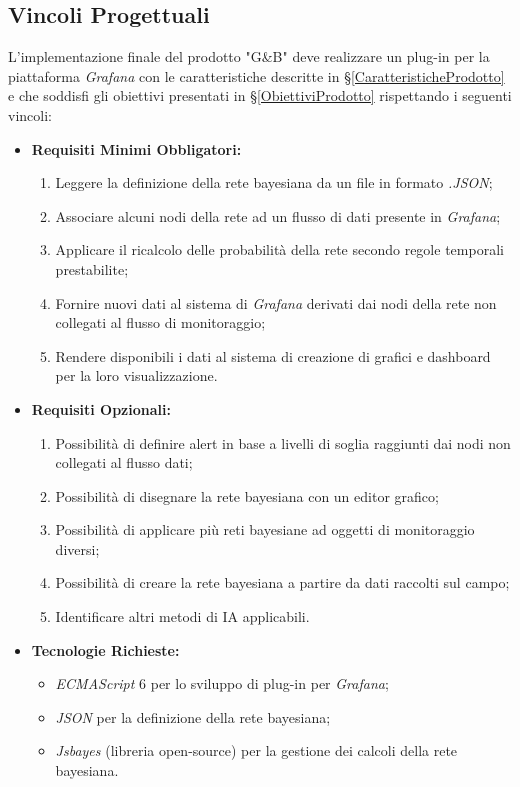\subsection{Vincoli Progettuali}\label{VincoliProgettuali}
L'implementazione finale del prodotto "G\&B" deve realizzare un plug-in per la piattaforma \textit{Grafana} con le caratteristiche descritte in §\ref{CaratteristicheProdotto} e che soddisfi gli obiettivi presentati in §\ref{ObiettiviProdotto} rispettando i seguenti vincoli:
\begin{itemize}
\item \textbf{Requisiti Minimi Obbligatori:}
	\begin{enumerate}
	\item Leggere la definizione della rete bayesiana da un file in formato \textit{.JSON};
	\item Associare alcuni nodi della rete ad un flusso di dati presente in \textit{Grafana};
	\item Applicare il ricalcolo delle probabilità della rete secondo regole temporali prestabilite;
	\item Fornire nuovi dati al sistema di \textit{Grafana} derivati dai nodi della rete non collegati al flusso di monitoraggio;
	\item Rendere disponibili i dati al sistema di creazione di grafici e dashboard per la loro visualizzazione.
	\end{enumerate}
\item \textbf{Requisiti Opzionali:}
	\begin{enumerate}
	\item Possibilità di definire alert in base a livelli di soglia raggiunti dai nodi non collegati al flusso dati;
	\item Possibilità di disegnare la rete bayesiana con un editor grafico;
	\item Possibilità di applicare più reti bayesiane ad oggetti di monitoraggio diversi;
	\item Possibilità di creare la rete bayesiana a partire da dati raccolti sul campo;
	\item Identificare altri metodi di IA applicabili.
	\end{enumerate}
\item \textbf{Tecnologie Richieste:}
	\begin{itemize}
	\item \textit{ECMAScript} 6 per lo sviluppo di plug-in per \textit{Grafana};
	\item \textit{JSON} per la definizione della rete bayesiana;
	\item \textit{Jsbayes} (libreria open-source) per la gestione dei calcoli della rete bayesiana.
	\end{itemize}
\end{itemize}
 
